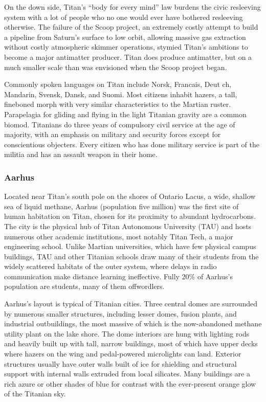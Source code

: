 On the down side, Titan's “body for every mind” law burdens the civic resleeving system with a lot of people who no one would ever have bothered resleeving otherwise. The failure of the Scoop project, an extremely costly attempt to build a pipeline from Saturn's surface to low orbit, allowing massive gas extraction without costly atmospheric skimmer operations, stymied Titan's ambitions to become a major antimatter producer. Titan does produce antimatter, but on a much smaller scale than was envisioned when the Scoop project began. 

Commonly spoken languages on Titan include Norsk, Francais, Deut ch, Mandarin, Svensk, Dansk, and Suomi. Most citizens inhabit hazers, a tall, fineboned morph with very similar characteristics to the Martian ruster. Parapelagia for gliding and flying in the light Titanian gravity are a common biomod. Titanians do three years of compulsory civil service at the age of majority, with an emphasis on military and security forces except for conscientious objecters. Every citizen who has done military service is part of the militia and has an assault weapon in their home. 

\subsubsection{Aarhus}
\label{sec:aarhus} 

Located near Titan's south pole on the shores of Ontario Lacus, a wide, shallow sea of liquid methane, Aarhus (population five million) was the first site of human habitation on Titan, chosen for its proximity to abundant hydrocarbons. The city is the physical hub of Titan Autonomous University (TAU) and hosts numerous other academic institutions, most notably Titan Tech, a major engineering school. Unlike Martian universities, which have few physical campus buildings, TAU and other Titanian schools draw many of their students from the widely scattered habitats of the outer system, where delays in radio communication make distance learning ineffective. Fully 20\% of Aarhus's population are students, many of them offwordlers. 

Aarhus's layout is typical of Titanian cities. Three central domes are surrounded by numerous smaller structures, including lesser domes, fusion plants, and industrial outbuildings, the most massive of which is the now-abandoned methane utility plant on the lake shore. The dome interiors are hung with lighting rods and heavily built up with tall, narrow buildings, most of which have upper decks where hazers on the wing and pedal-powered microlights can land. Exterior structures usually have outer walls built of ice for shielding and structural support with internal walls extruded from local silicates. Many buildings are a rich azure or other shades of blue for contrast with the ever-present orange glow of the Titanian sky. 

